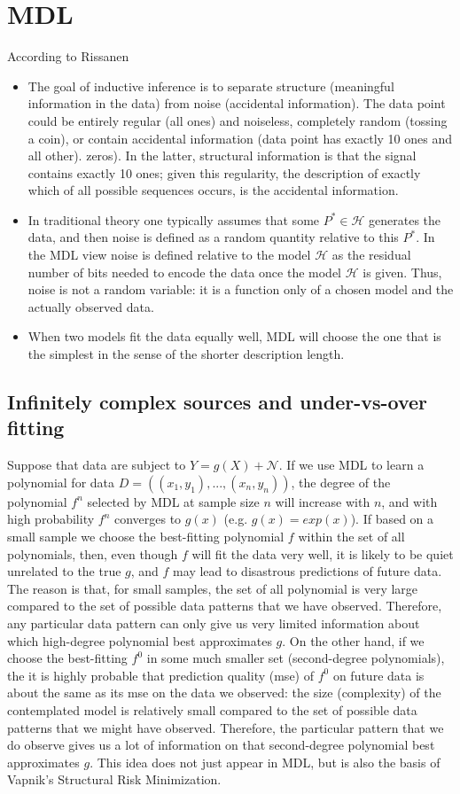 \documentclass[../../main.tex]{subfiles}
\numberwithin{equation}{section}
\begin{document}
\section{MDL}
According to Rissanen
\begin{itemize}
    \item The goal of inductive inference is to separate structure (meaningful information in the data) from noise (accidental information). The data point could be entirely regular (all ones) and noiseless, completely random (tossing a coin), or contain accidental information (data point has exactly 10 ones and all other). zeros). In the latter, structural information is that the signal contains exactly 10 ones; given this regularity, the description of exactly which of all possible sequences occurs, is the accidental information.
    \item In traditional theory one typically assumes that some $P^*\in \mathcal{H}$ generates the data, and then noise is defined as a random quantity relative to this $P^*$. In the MDL view noise is defined relative to the model $\mathcal{H}$ as the residual number of bits needed to encode the data once the model $\mathcal{H}$ is given. Thus, noise is not a random variable: it is a function only of a chosen model and the actually observed data.
    \item When two models fit the data equally well, MDL will choose the one that is the simplest in the sense of the shorter description length.
\end{itemize}
\subsection{Infinitely complex sources and under-vs-over fitting}

Suppose that data are subject to $Y=g(X) + \mathcal{N}$. If we use MDL to learn a polynomial for data $D=((x_1, y_1), ..., (x_n, y_n))$, the degree of the polynomial $f^n$ selected by MDL at sample size $n$ will increase with $n$, and with high probability $f^n$ converges to $g(x)$ (e.g. $g(x)=exp(x)$). If based on a small sample we choose the best-fitting polynomial $f$ within the set of all polynomials, then, even though $f$ will fit the data very well, it is likely to be quiet unrelated to the true $g$, and $f$ may lead to disastrous predictions of future data. The reason is that, for small samples, the set of all polynomial is very large compared to the set of possible data patterns that we have observed. Therefore, any particular data pattern can only give us very limited information about which high-degree polynomial best approximates $g$. On the other hand, if we choose the best-fitting $f^0$ in some much smaller set (second-degree polynomials), the it is highly probable that prediction quality (mse) of $f^0$ on future data is about the same as its mse on the data we observed: the size (complexity) of the contemplated model is relatively small compared to the set of possible data patterns that we might have observed. Therefore, the particular pattern that we do observe gives us a lot of information on that second-degree polynomial best approximates $g$. This idea does not just appear in MDL, but is also the basis of Vapnik's Structural Risk Minimization.
\end{document}
